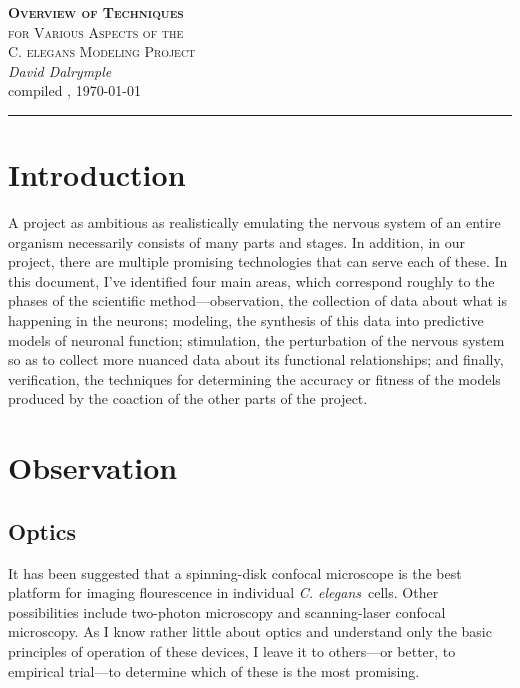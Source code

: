 \documentclass[letter,11pt]{article}
\newcommand{\cel}{{\em C. elegans}}
\begin{document}
\begin{center}
  \textsc{\LARGE \textbf{Overview of Techniques} \\[0.5mm] for Various Aspects of the \\[2.8mm] C. elegans Modeling Project}\\[3mm]
	\textit{\Large David Dalrymple}\\[2mm]
	{\large compiled \currenttime, \today\\[0mm]}
	\rule[2mm]{0.66\textwidth}{0.25mm}
\end{center}

\section*{Introduction}

A project as ambitious as realistically emulating the nervous system of an entire organism
necessarily consists of many parts and stages. In addition, in our project, there are
multiple promising technologies that can serve each of these. In this document, I've
identified four main areas, which correspond roughly to the phases of the scientific
method---observation, the collection of data about what is happening in the neurons;
modeling, the synthesis of this data into predictive models of neuronal function;
stimulation, the perturbation of the nervous system so as to collect more nuanced
data about its functional relationships; and finally, verification, the techniques
for determining the accuracy or fitness of the models produced by the coaction
of the other parts of the project.

\tableofcontents

\section{Observation}

\subsection{Optics}

It has been suggested that a spinning-disk confocal microscope is the best
platform for imaging flourescence in individual \cel\ cells.  Other
possibilities include two-photon microscopy and scanning-laser confocal
microscopy. As I know rather little about optics and understand only the basic
principles of operation of these devices, I leave it to others---or better, to
empirical trial---to determine which of these is the most promising.
\end{document}
